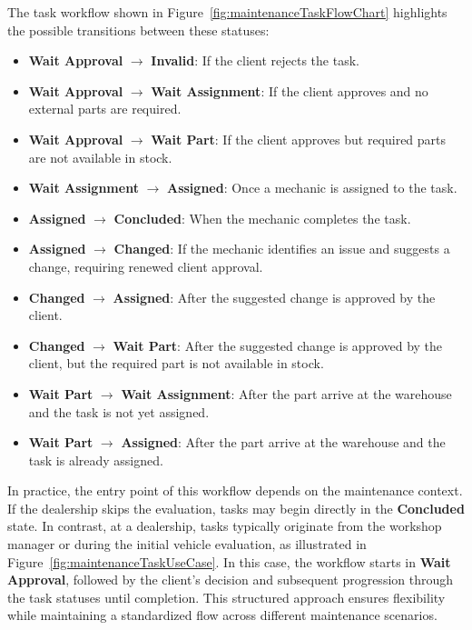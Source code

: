 The task workflow shown in Figure~\ref{fig:maintenanceTaskFlowChart} highlights the possible transitions between these statuses:
\begin{itemize}
\item \textbf{Wait Approval} $\rightarrow$ \textbf{Invalid}: If the client rejects the task.
\item \textbf{Wait Approval} $\rightarrow$ \textbf{Wait Assignment}: If the client approves and no external parts are required.
\item \textbf{Wait Approval} $\rightarrow$ \textbf{Wait Part}: If the client approves but required parts are not available in stock.
\item \textbf{Wait Assignment} $\rightarrow$ \textbf{Assigned}: Once a mechanic is assigned to the task.
\item \textbf{Assigned} $\rightarrow$ \textbf{Concluded}: When the mechanic completes the task.
\item \textbf{Assigned} $\rightarrow$ \textbf{Changed}: If the mechanic identifies an issue and suggests a change, requiring renewed client approval.
\item \textbf{Changed} $\rightarrow$ \textbf{Assigned}: After the suggested change is approved by the client.
\item \textbf{Changed} $\rightarrow$ \textbf{Wait Part}: After the suggested change is approved by the client, but the required part is not available in stock.
\item \textbf{Wait Part} $\rightarrow$ \textbf{Wait Assignment}: After the part arrive at the warehouse and the task is not yet assigned. 
\item \textbf{Wait Part} $\rightarrow$ \textbf{Assigned}: After the part arrive at the warehouse and the task is already assigned. 

\end{itemize}

In practice, the entry point of this workflow depends on the maintenance context. If the dealership skips the evaluation, tasks may begin directly in the \textbf{Concluded} state. In contrast, at a dealership, tasks typically originate from the workshop manager or during the initial vehicle evaluation, as illustrated in Figure~\ref{fig:maintenanceTaskUseCase}. In this case, the workflow starts in \textbf{Wait Approval}, followed by the client's decision and subsequent progression through the task statuses until completion. This structured approach ensures flexibility while maintaining a standardized flow across different maintenance scenarios.



